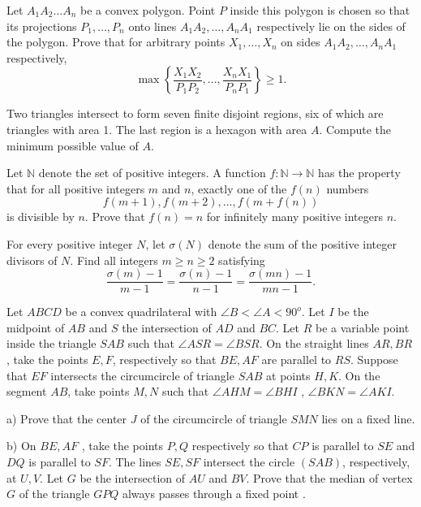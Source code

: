 \documentclass[11pt]{scrartcl}
\begin{document}
\begin{problem}[1557927271810341706]
	Let $A_1A_2 \ldots A_n$ be a convex polygon. Point $P$ inside this polygon is chosen so that its projections $P_1, \ldots , P_n$ onto lines $A_1A_2, \ldots , A_nA_1$ respectively lie on the sides of the polygon. Prove that for arbitrary points $X_1, \ldots , X_n$ on sides $A_1A_2, \ldots , A_nA_1$ respectively,
\[\max \left\{ \frac{X_1X_2}{P_1P_2}, \ldots, \frac{X_nX_1}{P_nP_1} \right\} \geq 1.\]
\end{problem}
\begin{problem}[1580707630770476037]
Two triangles intersect to form seven finite disjoint regions, six of which are triangles with area 1. The last region is a hexagon with area \(A\). Compute the minimum possible value of \(A\).
\end{problem}
\begin{problem}[1598288382590173390]
Let $\mathbb N$ denote the set of positive integers. A function $f\colon\mathbb N\to\mathbb N$ has the property that for all positive integers $m$ and $n$, exactly one of the $f(n)$ numbers
\[f(m+1),f(m+2),\ldots,f(m+f(n))\]is divisible by $n$. Prove that $f(n)=n$ for infinitely many positive integers $n$.
\end{problem}
\begin{problem}[1612300762204186997]
For every positive integer $N$, let $\sigma(N)$ denote the sum of the positive integer divisors of $N$. Find all integers $m\geq n\geq 2$ satisfying\[\frac{\sigma(m)-1}{m-1}=\frac{\sigma(n)-1}{n-1}=\frac{\sigma(mn)-1}{mn-1}.\]
\end{problem}
\begin{problem}[1613309914397651478]
Let $ABCD$ be a convex quadrilateral with $\angle B < \angle A < 90^{o}$. Let $I$ be the midpoint of $AB$ and $S$ the intersection of $AD$ and $BC$. Let $R$ be a variable point inside the triangle $SAB$ such that $\angle ASR = \angle BSR$. On the straight lines $AR, BR$ , take the points $E, F$, respectively so that $BE , AF$ are parallel to $RS$. Suppose that $EF$ intersects the circumcircle of triangle $SAB$ at points $H, K$. On the segment $AB$, take points $M , N$ such that $\angle AHM =\angle BHI$ , $\angle BKN = \angle AKI$.

a) Prove that the center $J$ of the circumcircle of triangle $SMN$ lies on a fixed line.

b) On $BE, AF$ , take the points $P, Q$ respectively so that $CP$ is parallel to $SE$ and $DQ$ is parallel to $SF$. The lines $SE, SF$ intersect the circle $(SAB)$, respectively, at $U, V$. Let $G$ be the intersection of $AU$ and $BV$. Prove that the median of vertex $G$ of the triangle $GPQ$ always passes through a fixed point .
\end{problem}
\end{document}
